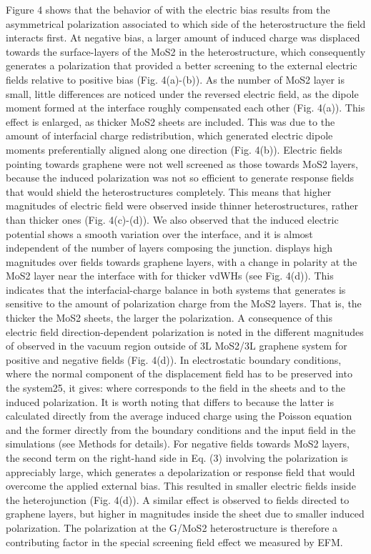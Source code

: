 Figure 4 shows that the behavior of   with the electric bias results from the asymmetrical polarization   associated to which side of the heterostructure the field interacts first. At negative bias, a larger amount of induced charge   was displaced towards the surface-layers of the MoS2 in the heterostructure, which consequently generates a polarization   that provided a better screening to the external electric fields relative to positive bias (Fig. 4(a)-(b)). As the number of MoS2 layer is small, little differences are noticed under the reversed electric field, as the dipole moment formed at the interface roughly compensated each other (Fig. 4(a)).  This effect is enlarged, as thicker MoS2 sheets are included. This was due to the amount of interfacial charge redistribution, which generated electric dipole moments preferentially aligned along one direction (Fig. 4(b)). Electric fields pointing towards graphene were not well screened as those towards MoS2 layers, because the induced polarization was not so efficient to generate response fields   that would shield the heterostructures completely. This means that higher magnitudes of electric field were observed inside thinner heterostructures, rather than thicker ones (Fig. 4(c)-(d)). We also observed that the induced electric potential   shows a smooth variation over the interface, and it is almost independent of the number of layers composing the junction.    displays high magnitudes over fields towards graphene layers, with a change in polarity at the MoS2 layer near the interface with   for thicker vdWHs (see Fig. 4(d)). This indicates that the interfacial-charge balance in both systems that generates   is sensitive to the amount of polarization charge from the MoS2 layers. That is, the thicker the MoS2 sheets, the larger the polarization. A consequence of this electric field direction-dependent polarization is noted in the different magnitudes of  observed in the vacuum region outside of 3L MoS2/3L graphene system for positive and negative fields (Fig. 4(d)).  In electrostatic boundary conditions, where the normal component of the displacement field   has to be preserved into the system25, it gives: 
where  corresponds to the field in the sheets and   to the induced polarization.  It is worth noting that   differs to   because the latter is calculated directly from the average induced charge using the Poisson equation and the former directly from the boundary conditions and the input field in the simulations (see Methods for details). For negative fields towards MoS2 layers, the second term on the right-hand side in Eq. (3) involving the polarization is appreciably large, which generates a depolarization or response field  that would overcome the applied external bias. This resulted in smaller electric fields inside the heterojunction (Fig. 4(d)). A similar effect is observed to fields directed to graphene layers, but higher in magnitudes inside the sheet due to smaller induced polarization. The polarization at the G/MoS2 heterostructure is therefore a contributing factor in the special screening field effect we measured by EFM. 
